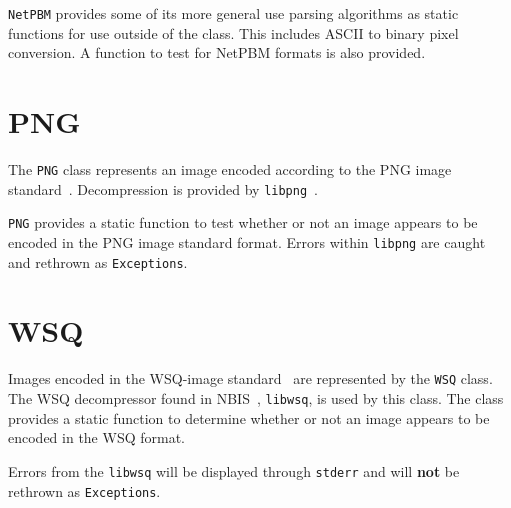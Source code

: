 \texttt{NetPBM} provides some of its more general use parsing algorithms as
static functions for use outside of the class.  This includes ASCII to binary
pixel conversion.  A function to test for NetPBM formats is also provided.

\section{PNG}
\label{sec-image-png}
The \texttt{PNG} class represents an image encoded according to the PNG image 
standard~\cite{png}.  Decompression is provided by 
\texttt{libpng}~\cite{libpng}.

\texttt{PNG} provides a static function to test whether or not an image appears
to be encoded in the PNG image standard format.  Errors within \texttt{libpng}
are caught and rethrown as \texttt{Exceptions}.

\section{WSQ}
\label{sec-image-wsq}
Images encoded in the WSQ-image standard~\cite{wsq} are represented by the 
\texttt{WSQ} class.  The WSQ decompressor found in NBIS~\cite{nbis}, 
\texttt{libwsq}, is used by this class.  The class provides a static function to determine whether or not an image appears to be encoded in the WSQ format.

Errors from the \texttt{libwsq} will be displayed through \texttt{stderr}
and will {\bf not} be rethrown as \texttt{Exceptions}.
